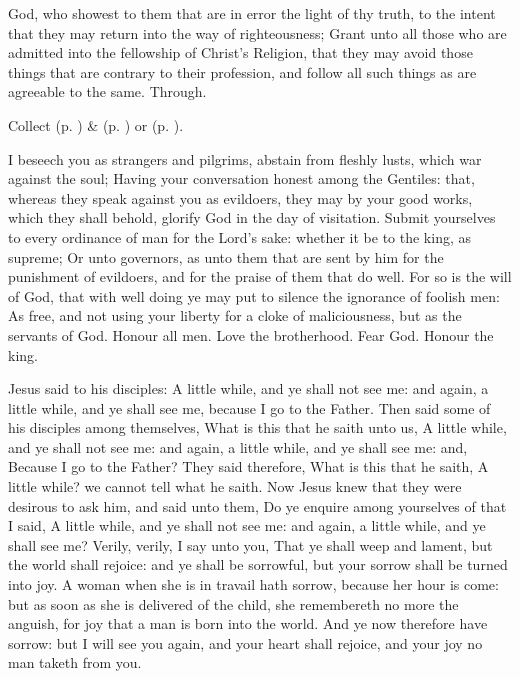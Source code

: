 \collect

\vspace{-0.1\baselineskip}

 God, who showest to them that are in error the light of thy truth, to the intent that they may return into the way of righteousness; Grant unto all those who are admitted into the fellowship of Christ's Religion, that they may avoid those things that are contrary to their profession, and follow all such things as are agreeable to the same. Through.
\begin{rubric}
     Collect  (p. \pageref{SPMaryInEaster}) \&   (p. \pageref{SPAgainst}) or  (p. \pageref{SPChiefBishop}).
\end{rubric}
 I beseech you as strangers and pilgrims, abstain from fleshly lusts, which war against the soul; Having your conversation honest among the Gentiles: that, whereas they speak against you as evildoers, they may by your good works, which they shall behold, glorify God in the day of visitation. Submit yourselves to every ordinance of man for the Lord's sake: whether it be to the king, as supreme; Or unto governors, as unto them that are sent by him for the punishment of evildoers, and for the praise of them that do well. For so is the will of God, that with well doing ye may put to silence the ignorance of foolish men: As free, and not using your liberty for a cloke of maliciousness, but as the servants of God. Honour all men. Love the brotherhood. Fear God. Honour the king.


 Jesus said to his disciples: A little while, and ye shall not see me: and again, a little while, and ye shall see me, because I go to the Father. Then said some of his disciples among themselves, What is this that he saith unto us, A little while, and ye shall not see me: and again, a little while, and ye shall see me: and, Because I go to the Father? They said therefore, What is this that he saith, A little while? we cannot tell what he saith. Now Jesus knew that they were desirous to ask him, and said unto them, Do ye enquire among yourselves of that I said, A little while, and ye shall not see me: and again, a little while, and ye shall see me? Verily, verily, I say unto you, That ye shall weep and lament, but the world shall rejoice: and ye shall be sorrowful, but your sorrow shall be turned into joy. A woman when she is in travail hath sorrow, because her hour is come: but as soon as she is delivered of the child, she remembereth no more the anguish, for joy that a man is born into the world. And ye now therefore have sorrow: but I will see you again, and your heart shall rejoice, and your joy no man taketh from you.

